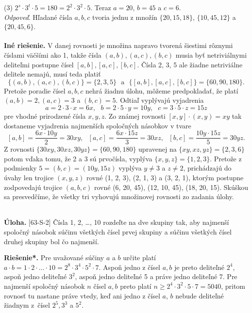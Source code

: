 \documentclass[11pt,a4paper,oneside,final]{book}
\newcommand{\ul}{\textbf{Úloha.} }
\newcommand{\rieh}{\textbf{Riešenie*.} }
\begin{document}
(3) $2^s \cdot 3^t \cdot 5 = 180 = 2^2 \cdot 3^2 \cdot 5$. Teraz $a = 20$, $b = 45$ a $c = 6$.\\
\textit{Odpoveď}. Hľadané čísla $a, b, c$ tvoria jednu z množín $\{20, 15, 18\}$, $\{10, 45, 12\}$ a $\{20, 45, 6\}$.\\
\\
\textbf{Iné riešenie.} V danej rovnosti je množina napravo tvorená šiestimi rôznymi číslami väčšími ako 1, takže čísla $(a, b), (a, c), (b, c)$ musia byť netriviálnymi deliteľmi postupne čísel $[a, b], [a, c], [b, c]$. Čísla 2, 3, 5 ale žiadne netriviálne delitele nemajú, musí teda platiť
$$\{(a, b), (a, c), (b, c)\}= \{2, 3, 5\} \ \ \ \text{a} \ \ \  \{[a, b], [a, c], [b, c]\} = \{60, 90, 180\}.$$
Pretože poradie čísel $a, b, c$ nehrá žiadnu úlohu, môžeme predpokladať, že platí $(a, b) = 2, (a, c) = 3$ a $(b, c) = 5$. Odtiaľ vyplývajú vyjadrenia
$$a = 2 \cdot 3 \cdot x = 6x, \ \ \ b = 2 \cdot 5 \cdot y = 10y, \ \ \ c = 3 \cdot 5 \cdot z = 15z$$
pre vhodné prirodzené čísla $x, y, z$. Zo známej rovnosti $[x, y]\cdot(x, y) = xy$ tak dostaneme vyjadrenia najmenších spoločných násobkov v tvare
$$[a, b] =\frac{6x \cdot 10y}{2}= 30xy, \ \ \ [a, c] =\frac{6x \cdot 15z}{3}= 30xz,\ \ \  [b, c] =\frac{10y \cdot 15z}{5}= 30yz.$$
Z rovnosti $\{30xy, 30xz, 30yz\} = \{60, 90, 180\}$ upravenej na $\{xy, xz, yz\} = \{2, 3, 6\}$ potom vďaka tomu, že 2 a 3 sú prvočísla, vyplýva $\{x, y, z\} = \{1, 2, 3\}$. Pretože z podmienky $5 = (b, c) = (10y, 15z)$ vyplýva $y \neq 3$ a $z \neq 2$, prichádzajú do úvahy len trojice $(x, y, z)$ rovné (1, 2, 3), (2, 1, 3) a (3, 2, 1), ktorým postupne zodpovedajú trojice $(a, b, c)$ rovné (6, 20, 45), (12, 10, 45), (18, 20, 15). Skúškou sa presvedčíme, že všetky tri vyhovujú množinovej rovnosti zo zadania úlohy.\\
\\
\begin{tcolorbox}[breakable,notitle,boxrule=0pt,colback=light-gray,colframe=light-gray]\ul [63-S-2]
Čísla 1, 2, \ldots , 10 rozdeľte na dve skupiny tak, aby najmenší spoločný násobok súčinu všetkých čísel prvej skupiny a súčinu všetkých čísel druhej skupiny bol čo najmenší.

\end{tcolorbox}

\rieh Pre uvažované súčiny $a$ a $b$ určite platí $a \cdot b = 1 \cdot 2 \cdot \ldots \cdot 10 = 2^8 \cdot 3^4 \cdot 5^2 \cdot 7$. Aspoň jedno z čísel $a, b$ je preto deliteľné $2^4$, aspoň jedno deliteľné $3^2$, aspoň jedno deliteľné 5 a práve jedno deliteľné 7. Pre najmenší spoločný násobok $n$ čísel $a, b$ preto platí $n \geq 2^4 \cdot 3^2 \cdot 5 \cdot 7 = 5 040$, pritom rovnosť tu nastane práve vtedy, keď ani jedno z čísel $a$, $b$ nebude deliteľné žiadnym z~čísel $2^5, 3^3$ a $5^2$.
\end{document}
